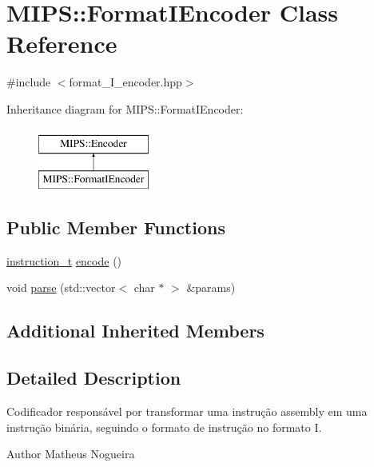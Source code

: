 \hypertarget{classMIPS_1_1FormatIEncoder}{}\section{M\+I\+PS\+:\+:Format\+I\+Encoder Class Reference}
\label{classMIPS_1_1FormatIEncoder}


{\ttfamily \#include $<$format\+\_\+\+I\+\_\+encoder.\+hpp$>$}

Inheritance diagram for M\+I\+PS\+:\+:Format\+I\+Encoder\+:\begin{figure}[H]
\begin{center}
\leavevmode
\includegraphics[height=2.000000cm]{classMIPS_1_1FormatIEncoder}
\end{center}
\end{figure}
\subsection*{Public Member Functions}
\begin{DoxyCompactItemize}
\item 
\hyperlink{core_8hpp_aa514fd240a0e29abb2a2e4c805d7f1a4}{instruction\+\_\+t} \hyperlink{classMIPS_1_1FormatIEncoder_af9fcd414057f2c01f2dada479d8592cb}{encode} ()
\item 
void \hyperlink{classMIPS_1_1FormatIEncoder_a04b46dc7d7b3734e42eaeedc500de2da}{parse} (std\+::vector$<$ char $\ast$ $>$ \&params)
\end{DoxyCompactItemize}
\subsection*{Additional Inherited Members}


\subsection{Detailed Description}
Codificador responsável por transformar uma instrução assembly em uma instrução binária, seguindo o formato de instrução no formato I.

\begin{DoxyAuthor}{Author}
Matheus Nogueira 
\end{DoxyAuthor}


